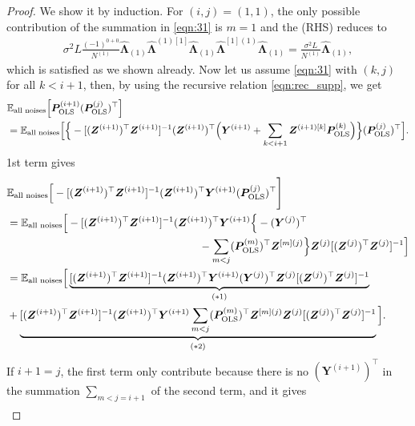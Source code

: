 \documentclass{article}
\begin{document}
\begin{proof}
We show it by induction.
For $(i, j) = (1, 1)$, the only possible contribution of the summation in \cref{eqn:31} is $m=1$ and the (RHS) reduces to
\begin{align}
\sigma^2 L
\frac{(-1)^{0+0}}{N^{(1)}}
\hat{\bm \Lambda}_{(1)}
\hat{\bm \Lambda}^{(1)[1]}
\hat{\bm \Lambda}_{(1)}
\hat{\bm \Lambda}^{[1](1)}
\hat{\bm \Lambda}_{(1)}
=
\frac{\sigma^2 L}{N^{(1)}}
\hat{\bm \Lambda}_{(1)},
\end{align}
which is satisfied as we shown already.
Now let us assume \cref{eqn:31} with $(k, j)$ for all $k< i+1$, then, by using the recursive relation \cref{eqn:rec_supp}, we get
\begin{align}
&\mathbb{E}_\text{all noises}
\Big[
\bm P_\mathrm{OLS}^{(i+1)}
(\bm P_\mathrm{OLS}^{(j)})^\top
\Big]
\notag \\
&=
\mathbb{E}_\text{all noises}
\Big[
\Big\{
-
[(\bm Z^{(i+1)})^\top \bm Z^{(i+1)} ]^{-1}
(\bm Z^{(i+1)})^\top
\Big(
\bm Y^{(i+1)}
+
\sum_{k<i+1}
\bm Z^{(i+1)[k]}
\bm P_\mathrm{OLS}^{(k)}
\Big)
\Big\}
(\bm P_\mathrm{OLS}^{(j)})^\top
\Big].
\label{eqn:41}
\end{align}
1st term gives
\begin{align}
&\E_\text{all noises}
\Big[
-
[(\bm Z^{(i+1)})^\top \bm Z^{(i+1)} ]^{-1}
(\bm Z^{(i+1)})^\top
\bm Y^{(i+1)}
(\bm P_\mathrm{OLS}^{(j)})^\top
\Bigg]
\notag \\
&= %
\E_\text{all noises}
\Big[
-
[(\bm Z^{(i+1)})^\top \bm Z^{(i+1)} ]^{-1}
(\bm Z^{(i+1)})^\top
\bm Y^{(i+1)}
\Big\{
-
(\bm Y^{(j)})^\top
\notag \\ & \hspace{180pt}
-
\sum_{m < j}
(\bm P_\mathrm{OLS}^{(m)})^\top
\bm Z^{[m](j)}
\Big\}
\bm Z^{(j)}
[(\bm Z^{(j)})^\top \bm Z^{(j)} ]^{-1}
\Big]
\notag \\
&= %
\E_\text{all noises}
\Big[
\underbrace{
[(\bm Z^{(i+1)})^\top \bm Z^{(i+1)} ]^{-1}
(\bm Z^{(i+1)})^\top
\bm Y^{(i+1)}
(\bm Y^{(j)})^\top
\bm Z^{(j)}
[(\bm Z^{(j)})^\top \bm Z^{(j)} ]^{-1}
}_{(*1)}
\notag \\ &
+
\underbrace{
[(\bm Z^{(i+1)})^\top \bm Z^{(i+1)} ]^{-1}
(\bm Z^{(i+1)})^\top
\bm Y^{(i+1)}
\sum_{m < j}
(\bm P_\mathrm{OLS}^{(m)})^\top
\bm Z^{[m](j)}
\bm Z^{(j)}
[(\bm Z^{(j)})^\top \bm Z^{(j)} ]^{-1}
}_{(*2)}
\Big].
\end{align}
If $i+1 = j$, the first term only contribute because there is no $(\bm Y^{(i+1)})^\top$ in the summation $\sum_{m < j=i+1}$ of the second term, and it gives
\begin{align}

\end{align}
\end{proof}
\end{document}
